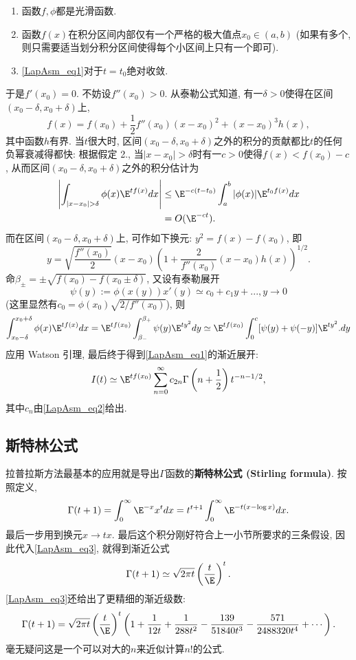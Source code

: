 \begin{enumerate}
\item 函数$f,\phi$都是光滑函数.

\item 函数$f(x)$在积分区间内部仅有一个严格的极大值点$x_0\in(a,b)$ (如果有多个, 则只需要适当划分积分区间使得每个小区间上只有一个即可). 

\item \autoref{LapAsm_eq1}对于$t=t_0$绝对收敛.
\end{enumerate}

于是$f'(x_0)=0$. 不妨设$f''(x_0)>0$. 从泰勒公式知道, 有一$\delta>0$使得在区间$(x_0-\delta,x_0+\delta)$上, 
$$
f(x)=f(x_0)+\frac{1}{2}f''(x_0)(x-x_0)^2+(x-x_0)^3h(x),
$$
其中函数$h$有界. 当$t$很大时, 区间$(x_0-\delta,x_0+\delta)$之外的积分的贡献都比$t$的任何负幂衰减得都快: 根据假定 2., 当$|x-x_0|>\delta$时有一$c>0$使得$f(x)<f(x_0)-c$, 从而区间$(x_0-\delta,x_0+\delta)$之外的积分估计为
$$
\begin{aligned}
\left|\int_{|x-x_0|>\delta}\phi(x)\E^{tf(x)}dx\right|
&\leq \E^{-c(t-t_0)}\int_a^b|\phi(x)|\E^{t_0f(x)}dx\\
&=O(\E^{-ct}).
\end{aligned}
$$
而在区间$(x_0-\delta,x_0+\delta)$上, 可作如下换元: $y^2=f(x)-f(x_0)$, 即
$$
y=\sqrt{\frac{f''(x_0)}{2}}(x-x_0)\left(1+\frac{2}{f''(x_0)}(x-x_0)h(x)\right)^{1/2}.
$$
命$\beta_{\pm}=\pm\sqrt{f(x_0)-f(x_0\pm\delta)}$, 又设有泰勒展开
\begin{equation}\label{LapAsm_eq2}
\psi(y):=\phi(x(y))x'(y)\simeq c_0+c_1y+...,y\to 0
\end{equation}
(这里显然有$c_0=\phi(x_0)\sqrt{2/f''(x_0)}$), 则
$$
\int_{x_0-\delta}^{x_0+\delta}\phi(x)\E^{tf(x)}dx
=\E^{tf(x_0)}\int_{\beta_{-}}^{\beta_+}\psi(y)\E^{ty^2}dy
\simeq\E^{tf(x_0)}\int_{0}^{c}[\psi(y)+\psi(-y)]\E^{ty^2}.dy
$$
应用 Watson 引理, 最后终于得到\autoref{LapAsm_eq1}的渐近展开:
\begin{equation}\label{LapAsm_eq3}
I(t)\simeq \E^{tf(x_0)}\sum_{n=0}^\infty c_{2n}\Gamma\left(n+\frac{1}{2}\right)t^{-n-1/2},
\end{equation}
其中$c_n$由\autoref{LapAsm_eq2}给出.

\subsection{斯特林公式}
拉普拉斯方法最基本的应用就是导出$\Gamma$函数的\textbf{斯特林公式 (Stirling formula)}. 按照定义,
$$
\Gamma(t+1)
=\int_0^\infty \E^{-x}x^tdx
=t^{t+1}\int_0^\infty \E^{-t(x-\log x)}dx.
$$
最后一步用到换元$x\to tx$. 最后这个积分刚好符合上一小节所要求的三条假设, 因此代入\autoref{LapAsm_eq3}, 就得到渐近公式
$$
\Gamma(t+1)\simeq\sqrt{2\pi t}\left(\frac{t}{\E}\right)^t.
$$
\autoref{LapAsm_eq3}还给出了更精细的渐近级数:
$$
  \Gamma(t+1)
  =\sqrt{2\pi t}\left({t\over \E}\right)^t
  \left(
   1
   +{1\over12t}
   +{1\over288t^2}
   -{139\over51840t^3}
   -{571\over2488320t^4}
   + \cdots
  \right).
$$
毫无疑问这是一个可以对大的$n$来近似计算$n!$的公式.
